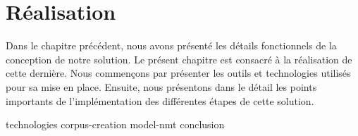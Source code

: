 \chapter{Réalisation}
\label{chap.realisation}

Dans le chapitre précédent, nous avons présenté les détails fonctionnels de la conception de notre solution.
Le présent chapitre est consacré à la réalisation de cette dernière.
Nous commençons par présenter les outils et technologies utilisés pour sa mise en place.
Ensuite, nous présentons dans le détail les points importants de l'implémentation des différentes étapes de cette solution.

{technologies}
{corpus-creation}
{model-nmt}
{conclusion}